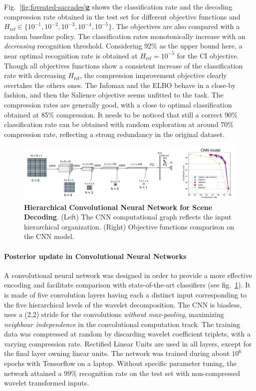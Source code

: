 \documentclass[12pt,twoside,openright]{article}
\begin{document}
Fig.~\ref{fig:foveated-saccades}\textbf{g} shows the classification rate and the decoding compression rate  obtained in the test set for different objective functions and $H_\text{ref} \in \{10^{-1}, 10^{-2}, 10^{-3}, 10^{-4}, 10^{-5}\}$. The objectives are also compared with a random baseline policy. The classification rates monotonically increase with an \emph{decreasing} recognition threshold. Considering 92\% as the upper bound here, a near optimal recognition rate is obtained  at $H_\text{ref}=10^{-5}$ for the CI objective. Though all objectives functions show a consistent increase of the classification rate with decreasing $H_\text{ref}$, the compression improvement objective clearly overtakes the others ones. The Infomax and the ELBO behave in a close-by fashion, and then the Salience objective seems unfitted to the task. 
The compression rates are generally good, with a close to optimal classification obtained at 85\% compression. It needs to be noticed that still a correct 90\% classification rate can be obtained with random exploration at around 70\% compression rate, reflecting a strong redundancy in the original dataset.  

\begin{figure}
	\centerline{
		\includegraphics[width = \linewidth]{img/NIPS-convolutional.pdf} 
	}
	\vspace{-.2cm}
	\caption{\textbf{Hierarchical Convolutional Neural Network for Scene Decoding}. (Left) The CNN computational graph reflects the input hierarchical organization. (Right) Objective functions comparison on the CNN model.}\label{fig:CNN}
\end{figure}

\paragraph{Posterior update in Convolutional Neural Networks}
A convolutional neural network was designed in order to provide a more effective encoding and facilitate comparison with state-of-the-art classifiers (see fig.~\ref{fig:CNN}). 
It is made of five convolution layers having each a distinct input corresponding to the five hierarchical levels of the wavelet decomposition. 
The CNN is biasless, uses a (2,2) stride for the convolutions \emph{without max-pooling}, maximizing \emph{neighbour independence} in the convolutional computation track.
The training data was compressed at random by discarding wavelet coefficient triplets, with a varying compression rate. Rectified Linear Units are used in all layers, except for the final layer owning linear units. The network was trained during about $10^6$ epochs with Tensorflow on a laptop. Without specific parameter tuning, the network attained a 99\% recognition rate on the test set with non-compressed wavelet transformed inputs. 
\end{document}
